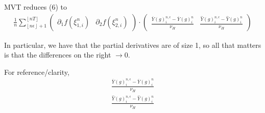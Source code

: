 \documentclass[12pt,letterpaper]{article}
\theoremstyle{lemma}
\theoremstyle{definition}
\begin{document}
MVT reduces (6) to
\begin{gather}
  \frac{1}{n}\sum_{\left\lfloor n\epsilon \right\rfloor + 1}^{\left\lfloor nT \right\rfloor} \begin{pmatrix} \partial_1 f(\xi_{1,i}^n) & \partial_2 f(\xi_{2,i}^n) \end{pmatrix} \cdot \begin{pmatrix} \frac{\overline{Y}(g)^{n,\epsilon}_i - \overline{Y}(g)^{n}_i}{\nu_H} & \frac{\widehat{Y}(g)^{n,\epsilon}_i - \widehat{Y}(g)^{n}_i}{\nu_H} \end{pmatrix}
\end{gather}

In particular, we have that the partial derivatives are of size 1, so all that matters is that the differences on the right \(\rightarrow 0\).

For reference/clarity,
\begin{gather}
  \frac{\overline{Y}(g)^{n,\epsilon}_i - \overline{Y}(g)^{n}_i}{\nu_H} \\
  \frac{\widehat{Y}(g)^{n,\epsilon}_i - \widehat{Y}(g)^{n}_i}{\nu_H}
\end{gather}
\end{document}
